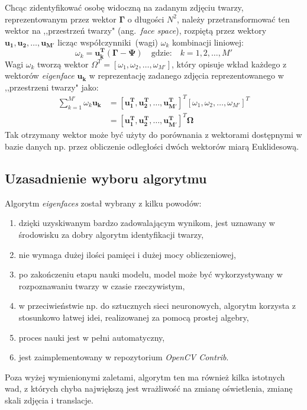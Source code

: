 \documentclass[a4paper,titlepage]{article}
\theoremstyle{break}
\numberwithin{equation}{subsection}
\begin{document}
Chcąc zidentyfikować osobę widoczną na zadanym zdjęciu twarzy, reprezentowanym przez wektor $\bm\Gamma$ o długości $N^2$, należy przetransformować ten wektor na ,,przestrzeń twarzy" (ang.~\emph{face space}), rozpiętą przez wektory~$\bm{u_1},\bm{u_2},\dotsc,\bm{u_{M'}}$ licząc współczynniki~(wagi) $\omega_k$ kombinacji liniowej:
\begin{equation}
	\omega_k=\bm{u_k^T}(\bm{\Gamma}-\bm{\Psi})\quad\text{gdzie:}\quad k=1,2,\dotsc,M'
\end{equation}
Wagi $\omega_k$ tworzą wektor $\Omega^T=[\omega_1,\omega_2,\dotsc,\omega_{M'}]$, który opisuje wkład każdego z wektorów \emph{eigenface} $\bm{u_k}$ w reprezentację zadanego zdjęcia reprezentowanego w ,,przestrzeni twarzy" jako:
\begin{equation}
\begin{split}
	\sum\limits_{k=1}^{M'}\omega_k\bm{u_k}&=[\bm{u_1^T},\bm{u_2^T},\dotsc,\bm{u_{M'}^T}]^T[\omega_1,\omega_2,\dotsc,\omega_{M'}]^T\\&=[\bm{u_1^T},\bm{u_2^T},\dotsc,\bm{u_{M'}^T}]^T\bm{\Omega}
\end{split}
\end{equation}
Tak otrzymany wektor może być użyty do porównania z wektorami dostępnymi w bazie danych np. przez obliczenie odległości dwóch wektorów miarą Euklidesową.


\subsection{Uzasadnienie wyboru algorytmu}

Algorytm \emph{eigenfaces} został wybrany z kilku powodów:
\begin{enumerate}
	\item dzięki uzyskiwanym bardzo zadowalającym wynikom, jest uznawany w środowisku za dobry algorytm identyfikacji twarzy,
	\item nie wymaga dużej ilości pamięci i dużej mocy obliczeniowej,
	\item po zakończeniu etapu nauki modelu, model może być wykorzystywany w rozpoznawaniu twarzy w czasie rzeczywistym,
	\item w przeciwieństwie np. do sztucznych sieci neuronowych, algorytm korzysta z stosunkowo łatwej idei, realizowanej za pomocą prostej algebry,
	\item proces nauki jest w pełni automatyczny,
	\item jest zaimplementowany w repozytorium \emph{OpenCV Contrib}.
\end{enumerate}
Poza wyżej wymienionymi zaletami, algorytm ten ma również kilka istotnych wad, z których chyba największą jest wrażliwość na zmianę oświetlenia, zmianę skali zdjęcia i translacje.
\end{document}
